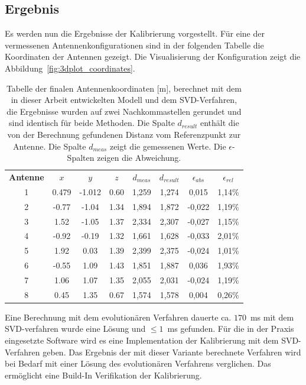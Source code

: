 \subsection{Ergebnis}
Es werden nun die Ergebnisse der Kalibrierung vorgestellt. Für eine der vermessenen Antennenkonfigurationen sind in der folgenden Tabelle die Koordinaten der Antennen gezeigt. Die Visualisierung der Konfiguration zeigt die Abbildung~\ref{fig:3dplot_coordinates}.
%
\begin{table} [ht!]
	\begin{center}
		\begin{tabular}{cccccccc}
		      \textbf{Antenne} & \textbf{$x$} & \textbf{$y$} & \textbf{$z$} & \textbf{$d_{meas}$} & \textbf{$d_{result}$}& \textbf{$\epsilon_{abs}$} & \textbf{$\epsilon_{rel}$} \\
		      1 & 0.479		& -1.012	& 0.60 & 1,259 & 1,274& 0,015 & 1,14\% \\
		      2 & -0.77 	& -1.04 	& 1.34 & 1,894 & 1,872 & -0,022 & 1,19\% \\
		      3 & 1.52  	& -1.05 	& 1.37 & 2,334 & 2,307 & -0,027 & 1,15\% \\
		      4 & -0.92 	& -0.19 	& 1.32 & 1,661 & 1,628 & -0,033 & 2,01\% \\
		      5 & 1.92 		&  0.03 	& 1.39 & 2,399 & 2,375 & -0,024 & 1,01\% \\
		      6 & -0.55 	&  1.09 	& 1.43 & 1,851 & 1,887 & 0,036 & 1,93\% \\
		      7 & 1.06 		&  1.07 	& 1.35 & 2,055 & 2,031 & -0,024 & 1,19\% \\
		      8 & 0.45 		&  1.35 	& 0.67 & 1,574 & 1,578 & 0,004 & 0,26\% \\					
%
		\end{tabular}
		\caption[Finale Antennen Koordinaten]{Tabelle der finalen Antennenkoordinaten [m], berechnet mit dem in dieser Arbeit entwickelten Modell und dem SVD-Verfahren, die Ergebnisse wurden auf zwei Nachkommastellen gerundet und sind identisch für beide Methoden. Die Spalte $d_{result}$ enthält die von der Berechnung gefundenen Distanz vom Referenzpunkt zur Antenne. Die Spalte $d_{meas}$ zeigt die gemessenen Werte. Die $\epsilon$-Spalten zeigen die Abweichung.}
		\label{tab:FinalCoords}
	\end{center}
\end{table}
%
Eine Berechnung mit dem evolutionären Verfahren dauerte ca. $170$~ms mit dem SVD-verfahren wurde eine Lösung und $\le 1$~ms gefunden. Für die in der Praxis eingesetzte Software wird es eine Implementation der Kalibrierung mit dem SVD-Verfahren geben. Das Ergebnis der mit dieser Variante berechnete Verfahren wird bei Bedarf mit einer Lösung des evolutionären Verfahrens verglichen. Das ermöglicht eine Build-In Verifikation der Kalibrierung.\\

